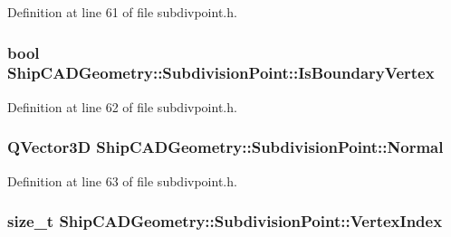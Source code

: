 Definition at line 61 of file subdivpoint.\-h.

\hypertarget{classShipCADGeometry_1_1SubdivisionPoint_af9d5dfd7c9c8bea01aab36388f0f0afe}{
\subsubsection[{Is\-Boundary\-Vertex}]{\setlength{\rightskip}{0pt plus 5cm}bool Ship\-C\-A\-D\-Geometry\-::\-Subdivision\-Point\-::\-Is\-Boundary\-Vertex\hspace{0.3cm}{\ttfamily [read]}}}\label{classShipCADGeometry_1_1SubdivisionPoint_af9d5dfd7c9c8bea01aab36388f0f0afe}


Definition at line 62 of file subdivpoint.\-h.

\hypertarget{classShipCADGeometry_1_1SubdivisionPoint_a547c0cb9b9641fcb9d6a5beb3a86d59c}{
\subsubsection[{Normal}]{\setlength{\rightskip}{0pt plus 5cm}Q\-Vector3\-D Ship\-C\-A\-D\-Geometry\-::\-Subdivision\-Point\-::\-Normal\hspace{0.3cm}{\ttfamily [read]}}}\label{classShipCADGeometry_1_1SubdivisionPoint_a547c0cb9b9641fcb9d6a5beb3a86d59c}


Definition at line 63 of file subdivpoint.\-h.

\hypertarget{classShipCADGeometry_1_1SubdivisionPoint_a3603dcd95c922b3852e0ba6f95a08b7f}{
\subsubsection[{Vertex\-Index}]{\setlength{\rightskip}{0pt plus 5cm}size\-\_\-t Ship\-C\-A\-D\-Geometry\-::\-Subdivision\-Point\-::\-Vertex\-Index\hspace{0.3cm}{\ttfamily [read]}}}\label{classShipCADGeometry_1_1SubdivisionPoint_a3603dcd95c922b3852e0ba6f95a08b7f}


